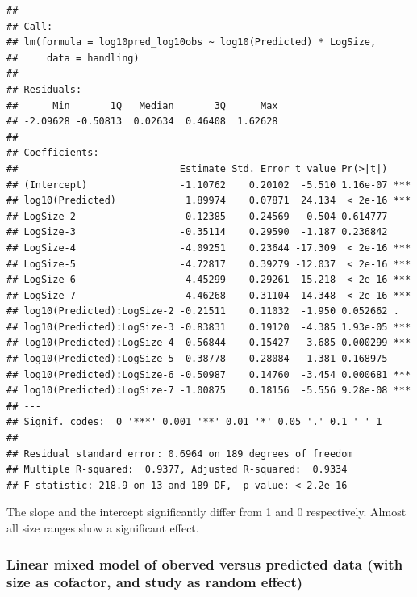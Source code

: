 \begin{verbatim}
## 
## Call:
## lm(formula = log10pred_log10obs ~ log10(Predicted) * LogSize, 
##     data = handling)
## 
## Residuals:
##      Min       1Q   Median       3Q      Max 
## -2.09628 -0.50813  0.02634  0.46408  1.62628 
## 
## Coefficients:
##                            Estimate Std. Error t value Pr(>|t|)    
## (Intercept)                -1.10762    0.20102  -5.510 1.16e-07 ***
## log10(Predicted)            1.89974    0.07871  24.134  < 2e-16 ***
## LogSize-2                  -0.12385    0.24569  -0.504 0.614777    
## LogSize-3                  -0.35114    0.29590  -1.187 0.236842    
## LogSize-4                  -4.09251    0.23644 -17.309  < 2e-16 ***
## LogSize-5                  -4.72817    0.39279 -12.037  < 2e-16 ***
## LogSize-6                  -4.45299    0.29261 -15.218  < 2e-16 ***
## LogSize-7                  -4.46268    0.31104 -14.348  < 2e-16 ***
## log10(Predicted):LogSize-2 -0.21511    0.11032  -1.950 0.052662 .  
## log10(Predicted):LogSize-3 -0.83831    0.19120  -4.385 1.93e-05 ***
## log10(Predicted):LogSize-4  0.56844    0.15427   3.685 0.000299 ***
## log10(Predicted):LogSize-5  0.38778    0.28084   1.381 0.168975    
## log10(Predicted):LogSize-6 -0.50987    0.14760  -3.454 0.000681 ***
## log10(Predicted):LogSize-7 -1.00875    0.18156  -5.556 9.28e-08 ***
## ---
## Signif. codes:  0 '***' 0.001 '**' 0.01 '*' 0.05 '.' 0.1 ' ' 1
## 
## Residual standard error: 0.6964 on 189 degrees of freedom
## Multiple R-squared:  0.9377, Adjusted R-squared:  0.9334 
## F-statistic: 218.9 on 13 and 189 DF,  p-value: < 2.2e-16
\end{verbatim}

The slope and the intercept significantly differ from 1 and 0
respectively. Almost all size ranges show a significant effect.

\hypertarget{linear-mixed-model-of-oberved-versus-predicted-data-with-size-as-cofactor-and-study-as-random-effect-1}{%
\subsubsection{Linear mixed model of oberved versus predicted data (with
size as cofactor, and study as random
effect)}\label{linear-mixed-model-of-oberved-versus-predicted-data-with-size-as-cofactor-and-study-as-random-effect-1}}


